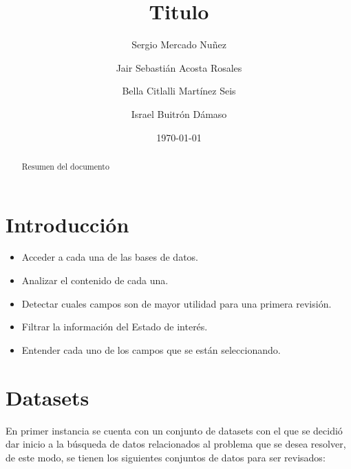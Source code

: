 \documentclass[10pt,letterpaper]{article}
\begin{document}
\title{Titulo}
\author{%
Sergio Mercado Nu\~nez
\and
Jair Sebasti\'an Acosta Rosales
\and
Bella Citlalli Mart\'inez Seis
\and
Israel Buitr\'on D\'amaso
}
\date{\today}

\maketitle

\begin{abstract}
  Resumen del documento
\end{abstract}

\section{Introducción} %
\label{sec:introduccion}

\begin{itemize}
\item Acceder a cada una de las bases de datos.
\item Analizar el contenido de cada una. 
\item Detectar cuales campos son de mayor utilidad para una primera revisi\'on.
\item Filtrar la informaci\'on del Estado de inter\'es.
\item Entender cada uno de los campos que se est\'an seleccionando.
\end{itemize}	

%
%
\section{Datasets}

En primer instancia se cuenta con un conjunto de datasets con el que se decidi\'o dar inicio a la b\'usqueda de datos relacionados al problema que se desea resolver, de este modo, se tienen los siguientes conjuntos de datos para ser revisados:
\end{document}
